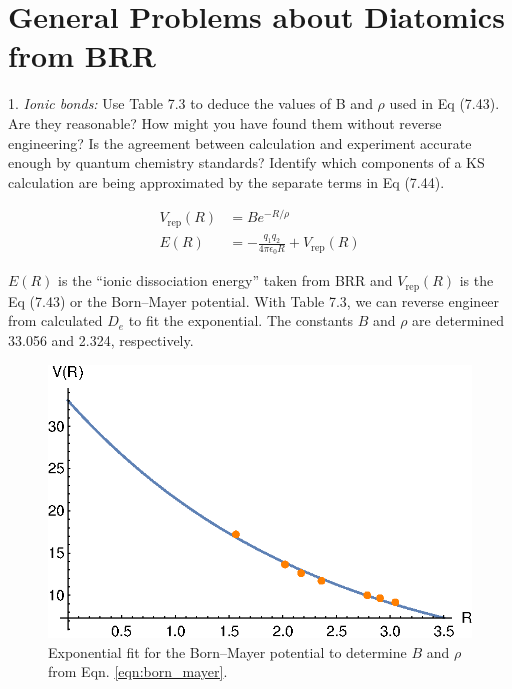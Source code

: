 \documentclass{article}
\begin{document}
\pagebreak

\section*{General Problems about Diatomics from BRR}

  1. \textit{Ionic bonds:} Use Table 7.3 to deduce the values of B and $\rho$ used in
  Eq (7.43). Are they reasonable? How might you have found them without reverse engineering?
  Is the agreement between calculation and experiment accurate enough by quantum chemistry
  standards? Identify which components of a KS calculation are being approximated by the
  separate terms in Eq (7.44).

  {\color{blue}
  \begin{align}
    V_{\text{rep}}(R) & = Be^{-R/\rho} \label{eqn:born_mayer}\\
    E(R) & = -\frac{q_1q_2}{4\pi\epsilon_0R} + V_{\text{rep}}(R)
    \label{eqn:dissociation}
  \end{align}

  $E(R)$ is the ``ionic dissociation energy'' taken from BRR and $V_{\text{rep}}(R)$ is
  the Eq (7.43) or the Born--Mayer potential. With Table 7.3, we can reverse engineer
  from calculated $D_e$ to fit the exponential. The constants $B$ and $\rho$ are
  determined 33.056 and 2.324, respectively.

  \begin{figure}[H]
    \centering
    \includegraphics[scale=1]{fitted_rhoB.eps}
    \caption{Exponential fit for the Born--Mayer potential to determine $B$ and
      $\rho$ from Eqn. \eqref{eqn:born_mayer}.}
    \label{fig:fit}
  \end{figure}
  
}
\end{document}
